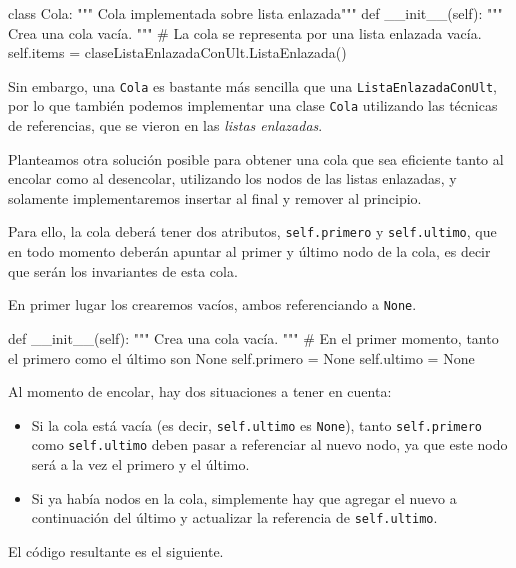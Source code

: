 \begin{codigo-python-sn}
class Cola:
    """ Cola implementada sobre lista enlazada"""
    def __init__(self):
        """ Crea una cola vacía. """
        # La cola se representa por una lista enlazada vacía.
        self.items = claseListaEnlazadaConUlt.ListaEnlazada()
\end{codigo-python-sn}

Sin embargo, una \lstinline!Cola! es bastante más sencilla que una
\lstinline!ListaEnlazadaConUlt!, por lo que también podemos
implementar una clase \lstinline!Cola! utilizando las técnicas de referencias,
que se vieron en las {\it listas enlazadas}.

Planteamos otra solución posible para obtener una cola que sea eficiente tanto al
encolar como al desencolar, utilizando los nodos de las listas enlazadas,
y solamente implementaremos insertar al final y remover al principio.

Para ello, la cola deberá tener dos atributos, \lstinline!self.primero! y
\lstinline!self.ultimo!, que en todo momento deberán apuntar al primer y
último nodo de la cola, es decir que serán los invariantes de esta cola.

En primer lugar los crearemos vacíos, ambos referenciando a
\lstinline!None!.

\begin{codigo-python-sn}
    def __init__(self):
        """ Crea una cola vacía. """
        # En el primer momento, tanto el primero como el último son None
        self.primero = None
        self.ultimo = None
\end{codigo-python-sn}

Al momento de encolar, hay dos situaciones a tener en cuenta:
\begin{itemize}

\item Si la cola está vacía (es decir, \lstinline!self.ultimo! es
\lstinline!None!), tanto \lstinline!self.primero! como
\lstinline!self.ultimo! deben pasar a referenciar al nuevo nodo, ya que
este nodo será a la vez el primero y el último.

\item Si ya había nodos en la cola, simplemente hay que agregar el nuevo a
continuación del último y actualizar la referencia de
\lstinline!self.ultimo!.

\end{itemize}

El código resultante es el siguiente.

